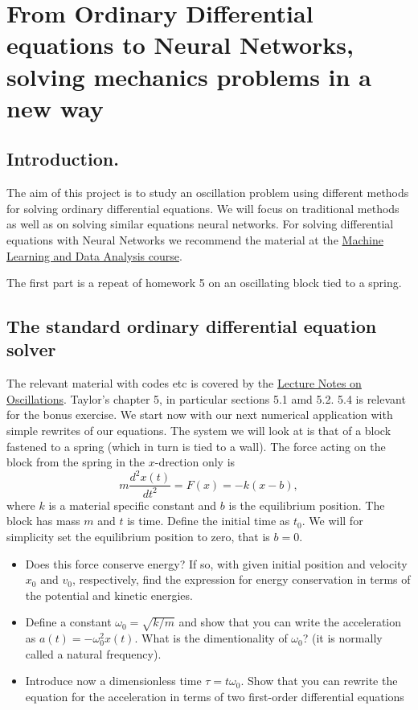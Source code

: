





\section*{From Ordinary Differential equations to Neural Networks, solving mechanics problems in a new way}

\subsection*{Introduction.}

The aim of this project is to study an oscillation problem using different methods for
solving ordinary differential equations. We will focus on traditional methods as well as
on solving similar equations neural networks. For solving differential equations with Neural Networks we recommend the material at
the \href{{https://compphysics.github.io/MachineLearning/doc/pub/odenn/html/odenn.html}}{Machine Learning and Data Analysis course}.

The first part is a repeat of homework 5 on an oscillating block tied to a spring.

\subsection{The standard ordinary differential equation solver}
The relevant material with codes etc is covered by the \href{{https://mhjensen.github.io/Physics321/doc/pub/harmonic/html/harmonic.html}}{Lecture Notes on Oscillations}. Taylor's chapter 5, in particular sections 5.1 amd 5.2. 5.4 is relevant for the bonus exercise.
We start now with our next numerical application with simple rewrites of our equations. The system we will look at is that of a block fastened to a spring (which in turn is tied to a wall).
The force acting on the block from the spring in the $x$-drection only is
\[
m\frac{d^2x(t)}{dt^2}=F(x) = -k(x-b),
\]
where $k$ is a material specific constant and $b$ is the equilibrium position. The block has mass $m$ and $t$ is time. Define the initial time as $t_0$. We will for simplicity set the equilibrium position to zero, that is $b=0$.

\begin{itemize}
\item Does this force conserve energy? If so, with given initial position and velocity $x_0$ and $v_0$, respectively, find the expression for energy conservation in terms of the potential and kinetic energies.  

\item Define a constant $\omega_0=\sqrt{k/m}$ and show that you can write the acceleration as $a(t) = -\omega_0^2 x(t)$. What is the dimentionality of $\omega_0$? (it is normally called a natural frequency).  

\item Introduce now a dimensionless time $\tau = t\omega_0$. Show that you can rewrite the  equation for the acceleration in terms of two first-order differential equations
\end{itemize}

